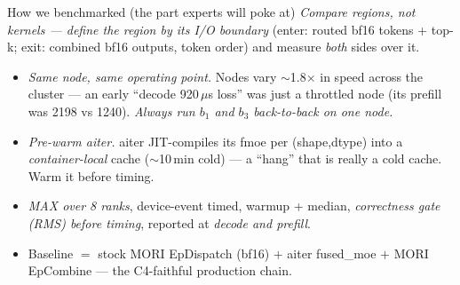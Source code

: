 \documentclass[pdf,aspectratio=169]{beamer}
\newcommand{\empy}[1]{{\color{darkorange}\emph{#1}}}
\newcommand{\empr}[1]{{\color{cardinalred}\emph{#1}}}
\newcommand{\mc}[1]{{\ttfamily\small #1}}
\begin{document}
\begin{frame}{How we benchmarked (the part experts will poke at)}
\footnotesize
\empr{Compare regions, not kernels --- define the region by its I/O boundary} (enter: routed bf16 tokens + top-k; exit: combined bf16 outputs, token order) and measure \emph{both} sides over it.
\begin{itemize}\footnotesize
  \item \empy{Same node, same operating point.} Nodes vary $\sim$1.8$\times$ in speed across the cluster --- an early ``decode 920\,$\mu$s loss'' was just a throttled node (its prefill was 2198 vs 1240). \empr{Always run $b_1$ and $b_3$ back-to-back on one node.}
  \item \empy{Pre-warm aiter.} aiter JIT-compiles its fmoe per (shape,dtype) into a \emph{container-local} cache ($\sim$10\,min cold) --- a ``hang'' that is really a cold cache. Warm it before timing.
  \item \empy{MAX over 8 ranks}, device-event timed, warmup + median, \empr{correctness gate (RMS) before timing}, reported at \emph{decode and prefill}.
  \item Baseline $=$ stock MORI \mc{EpDispatch} (bf16) $+$ aiter \mc{fused\_moe} $+$ MORI \mc{EpCombine} --- the C4-faithful production chain.
\end{itemize}
\end{frame}
\end{document}
